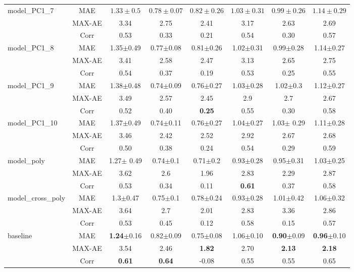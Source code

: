 \begin{table}[h!]
\begin{center}
\begin{tabular}{lc||c|c|c|c|c|c}
			\hline
			model\_PC1\_7&MAE &$1.33\pm{0.5}$&$0.78\pm{0.07}$&$0.82\pm{0.26}$&$1.03\pm{0.31}$&$0.99\pm{0.26}$&$1.14\pm{0.29}$\\
			&MAX-AE &3.34&2.75&2.41&3.17&2.63&2.69\\
			&Corr &0.53&0.33&0.21&0.54&0.30&0.57\\
			
			\hline
			model\_PC1\_8&MAE & 1.35$\pm$0.49 & 0.77$\pm$0.08& 0.81$\pm$0.26&1.02$\pm$0.31& 0.99$\pm$0.28 & 1.14$\pm$0.27\\
			&MAX-AE &3.41&2.58&2.47&3.13&2.65&2.75\\
			&Corr &0.54&0.37&0.19&0.53&0.25&0.55\\
			
			\hline
			model\_PC1\_9&MAE & 1.38$\pm$0.48 & 0.74$\pm$0.09 & 0.76$\pm$0.27 & 1.03$\pm$0.28 & 1.02$\pm$0.3 & 1.12$\pm$0.27\\
			&MAX-AE &3.49&2.57&2.45&2.9&2.7&2.67\\
			&Corr &0.52&0.40&\textbf{0.25}&0.55&0.30&0.58\\
			
			\hline
			model\_PC1\_10&MAE & 1.37$\pm$0.49 & 0.74$\pm$0.11 & 0.76$\pm$0.27 & 1.04$\pm$0.27 & 1.03$\pm$ 0.29& 1.11$\pm$0.28\\
			&MAX-AE &3.46&2.42&2.52&2.92&2.67&2.68\\
			&Corr &0.50&0.38&0.24&0.54&0.29&0.59\\
			
			\hline
			model\_poly&MAE & 1.27$\pm$ 0.49 & 0.74$\pm$0.1 & 0.71$\pm$0.2 & 0.93$\pm$0.28 & 0.95$\pm$0.31 & 1.03$\pm$0.25\\
			&MAX-AE &3.62&2.6&1.96&2.83&2.29&2.87\\
			&Corr &0.53&0.34&0.11&\textbf{0.61}&0.37&0.58\\
			
			\hline
			model\_cross\_poly&MAE & 1.3$\pm$0.47 & 0.75$\pm$0.1 & 0.78$\pm$0.24 & 0.93$\pm$0.28 & 1.01$\pm$0.42 & 1.06$\pm$0.32 \\
			&MAX-AE &3.64&2.7&2.01&2.83&3.36&2.86\\
			&Corr &0.53&0.45&0.12&0.58&0.15&0.57\\
			\hline  \hline
			
			baseline& MAE & \textbf{1.24}$\pm$0.16 & 0.82$\pm$0.09 & 0.75$\pm$0.08 & 1.06$\pm$0.10 & \textbf{0.90}$\pm$0.09 & \textbf{0.96}$\pm$0.10 \\
			&MAX-AE & 3.54 & 2.46 & \textbf{1.82} & 2.70 & \textbf{2.13} & \textbf{2.18}\\
			&Corr   & \textbf{0.61} & \textbf{0.64} &-0.08 & 0.55 & 0.55 & 0.65\\
			\hline
		\end{tabular}
	\end{center}
	\label{tab:H_testset}
\end{table}

